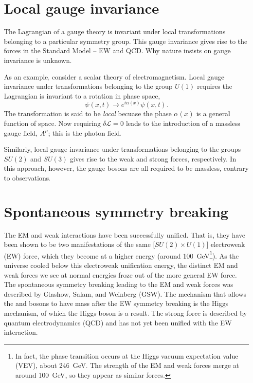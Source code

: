 \section{Local gauge invariance}
The Lagrangian of a gauge theory is invariant under local transformations belonging to a particular symmetry group. This gauge invariance gives rise to the forces in the Standard Model -- EW and QCD. Why nature insists on gauge invariance is unknown.

As an example, consider a scalar theory of electromagnetism. Local gauge invariance under transformations belonging to the group $U(1)$ requires the Lagrangian is invariant to a rotation in phase space,
\begin{equation}
\psi(x, t) \rightarrow e^{i\alpha(x)} \psi(x, t).
\end{equation}
The transformation is said to be \emph{local} becuase the phase $\alpha(x)$ is a general function of space. Now requiring $\delta\mathcal{L}=0$ leads to the introduction of a massless gauge field, $A^\mu$; this is the photon field.

Similarly, local gauge invariance under transformations belonging to the groups $SU(2)$ and $SU(3)$ gives rise to the weak and strong forces, respectively. In this approach, however, the gauge bosons are all required to be massless, contrary to observations.

\section{Spontaneous symmetry breaking}

The EM and weak interactions have been successfully unified. That is, they have been shown to be two manifestations of the same [$SU(2) \times U(1)$] electroweak (EW) force, which they become at a higher energy (around \SI{100}{\giga\electronvolt}\footnote{In fact, the phase transition occurs at the Higgs vacuum expectation value (VEV), about \SI{246}{\giga\electronvolt}. The strength of the EM and weak forces merge at around \SI{100}{\giga\electronvolt}, so they appear as similar forces.}). As the universe cooled below this electroweak unification energy, the distinct EM and weak forces we see at normal energies froze out of the more general EW force. The spontaneous symmetry breaking leading to the EM and weak forces was described by Glashow, Salam, and Weinberg (GSW). The mechanism that allows the \PW and \PZ bosons to have mass after the EW symmetry breaking is the Higgs mechanism, of which the Higgs boson is a result. The strong force is described by quantum electrodynamics (QCD) and has not yet been unified with the EW interaction.

